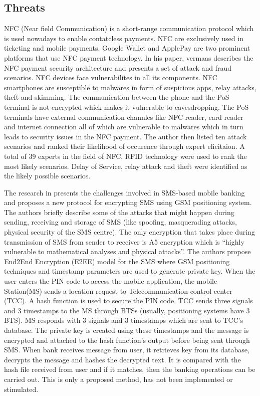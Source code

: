 \documentclass{mproj}
\begin{document}
\subsection{Threats}
NFC (Near field Communication) is a short-range communication protocol which is used nowadays to enable contatcless payments. NFC are exclusively used in ticketing and mobile payments\cite{vermaas}. Google Wallet and ApplePay are two prominent platforms that use NFC payment technology\cite{vermaas}. In his paper, vermaas \cite{vermaas} describes the NFC payment security architecture and presents a set of attack and fraud scenarios. NFC devices face vulnerabilites in all its components. NFC smartphones are susceptible to malwares in form of suspicious apps, relay attacks, theft and skimming. The communication between the phone and the PoS terminal is not encrypted whick makes it vulnerable to eavesdropping. The PoS terminals have external communication channles like NFC reader, card reader and internet connection all of which are vulnerable to malwares which in turn leads to security issues in the NFC payment. The author then listed ten attack scenarios and ranked their likelihood of occurence through expert elicitaion. A total of 39 experts in the field of NFC, RFID technology were used to rank the most likely scenarios. Delay of Service, relay attack and theft were identified as the likely possible scenarios.

The research in \cite{abolghasemi} presents the challenges involved in SMS-based mobile banking and proposes a new protocol for encrypting SMS using GSM positioning system. The authors briefly describe some of the attacks that might happen during sending, receiving and storage of SMS (like spoofing, masquerading attacks, physical security of the SMS centre). The only encryption that takes place during transmission of SMS from sender to receiver is A5 encryption which is “highly vulnerable to mathematical analyses and physical attacks”. The authors propose End2End Encryption (E2EE) model for the SMS where GSM positioning techniques and timestamp parameters are used to generate private key. When the user enters the PIN code to access the mobile application, the mobile Station(MS) sends a location request to Telecommunication control center (TCC). A hash function is used to secure the PIN code. TCC sends three signals and 3 timestamps to the MS through BTSs (usually, positioning systems have 3 BTS). MS responds with 3 signals and 3 timestamps which are sent to TCC’s database. The private key is created using these timestamps and the message is encrypted and attached to the hash function’s output before being sent through SMS. When bank receives message from user, it retrieves key from its database, decrypts the message and hashes the decrypted text. It is compared with the hash file received from user and if it matches, then the banking operations can be carried out. This is only a proposed method, has not been implemented or stimulated.
\end{document}
